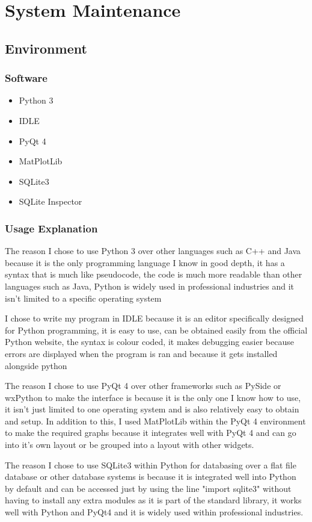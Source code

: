 \chapter{System Maintenance}

\section{Environment}

\subsection{Software}
\begin{itemize}
	\item Python 3
	\item IDLE
	\item PyQt 4
	\item MatPlotLib
	\item SQLite3
	\item SQLite Inspector
\end{itemize}

\subsection{Usage Explanation}
The reason I chose to use Python 3 over other languages such as C++ and Java because it is the only programming language I know in good depth, it has a syntax that is much like pseudocode, the code is much more readable than other languages such as Java, Python is widely used in professional industries and it isn't limited to a specific operating system

I chose to write my program in IDLE because it is an editor specifically designed for Python programming, it is easy to use, can be obtained easily from the official Python website, the syntax is colour coded, it makes debugging easier because errors are displayed when the program is ran and because it gets installed alongside python

The reason I chose to use PyQt 4 over other frameworks such as PySide or wxPython to make the interface is because it is the only one I know how to use, it isn't just limited to one operating system and is also relatively easy to obtain and setup. In addition to this, I used MatPlotLib within the PyQt 4 environment to make the required graphs because it integrates well with PyQt 4 and can go into it's own layout or be grouped into a layout with other widgets.

The reason I chose to use SQLite3 within Python for databasing over a flat file database or other database systems is because it is integrated well into Python by default and can be accessed just by using the line "import sqlite3" without having to install any extra modules as it is part of the standard library, it works well with Python and PyQt4 and it is widely used within professional industries.

